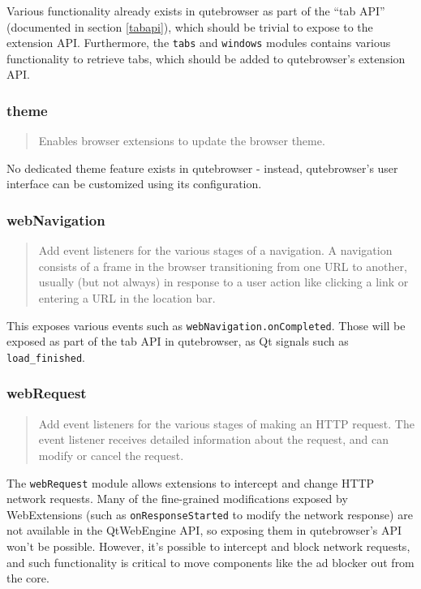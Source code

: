 \documentclass[a4paper,parskip=full]{scrreprt}
\begin{document}
Various functionality already exists in qutebrowser as part of the ``tab API''
(documented in section \ref{tabapi}), which should be trivial to expose to the
extension API. Furthermore, the \verb|tabs| and \verb|windows| modules contains
various functionality to retrieve tabs, which should be added to qutebrowser's
extension API.

\subsubsection{theme}
\begin{quote}
Enables browser extensions to update the browser theme.
\end{quote}

No dedicated theme feature exists in qutebrowser - instead, qutebrowser's user
interface can be customized using its configuration.

\subsubsection{webNavigation}
\begin{quote}
Add event listeners for the various stages of a navigation. A navigation consists of a frame in the browser transitioning from one URL to another, usually (but not always) in response to a user action like clicking a link or entering a URL in the location bar.
\end{quote}

This exposes various events such as \verb|webNavigation.onCompleted|. Those will
be exposed as part of the tab API in qutebrowser, as Qt signals such as \verb|load_finished|.

\subsubsection{webRequest}
\begin{quote}
Add event listeners for the various stages of making an HTTP request. The event listener receives detailed information about the request, and can modify or cancel the request.
\end{quote}

The \verb|webRequest| module allows extensions to intercept and change HTTP
network requests. Many of the fine-grained modifications exposed by
WebExtensions (such as \verb|onResponseStarted| to modify the network response)
are not available in the QtWebEngine API, so exposing them in qutebrowser's API
won't be possible. However, it's possible to intercept and block network
requests, and such functionality is critical to move components like the ad
blocker out from the core.
\end{document}
